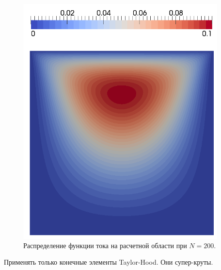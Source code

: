 \documentclass[12pt]{article}
\begin{document}
\begin{figure}
	\begin{center}
		\includegraphics[width=400px]{pics/pvd_psi_200}
		\caption{Распределение функции тока на расчетной области при $N=200$.}
		\label{fg:pvd_psi_200}
	\end{center}
\end{figure}

\newpage

Применять только конечные элементы Taylor-Hood. Они супер-круты.
\end{document}
